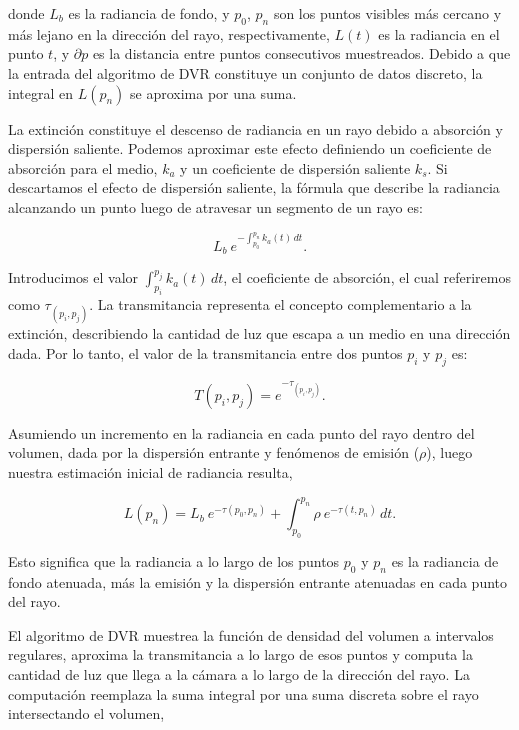 \noindent donde $L_b$ es la radiancia de fondo, y $p_0$, $p_n$ son los puntos visibles más cercano y más lejano en la dirección del rayo, respectivamente, $L(t)$  es la radiancia en el punto $t$, y $\partial p$ es la distancia entre puntos consecutivos muestreados. 
Debido a que la entrada del algoritmo de DVR constituye un conjunto de datos discreto, la integral en $L(p_n)$ se aproxima por una suma.

La extinción constituye el descenso de radiancia en un rayo debido a absorción y dispersión saliente.
Podemos aproximar este efecto definiendo un coeficiente de absorción para el medio, $k_a$ y un coeficiente de dispersión saliente $k_s$. 
Si descartamos el efecto de dispersión saliente, la fórmula que describe la radiancia alcanzando un punto luego de atravesar un segmento de un rayo es:

\begin{equation} \label{eq:radiance_absorption}  
    L_b \ e^{- \textstyle  \int_{p_0}^{p_n} k_a(t) \, dt}.
\end{equation}

Introducimos el valor $\int_{p_i}^{p_j} k_a(t) \, dt$, el coeficiente de absorción, el cual referiremos como $\tau_{(p_i, p_j)}$. 
La transmitancia representa el concepto complementario a la extinción, describiendo la cantidad de luz que escapa a un medio en una dirección dada.
Por lo tanto, el valor de la transmitancia entre dos puntos $p_i$ y $p_j$ es:

\begin{equation} \label{eq:transmittance}  
  T(p_i,p_j) = e^{- \textstyle \tau_{(p_i, p_j)}}.
\end{equation}

Asumiendo un incremento en la radiancia en cada punto del rayo dentro del volumen, dada por la dispersión entrante y fenómenos de emisión ($\rho$), luego nuestra estimación inicial de radiancia resulta,

\begin{equation} \label{eq:ray_radiance}  
  L(p_n) = L_b \ e^{-\tau(p_0, p_n)} + \int_{p_0}^{p_n} \rho \ e^{-\tau(t,p_n)} \, dt.
\end{equation}

Esto significa que la radiancia a lo largo de los puntos $p_0$ y $p_n$ es la radiancia de fondo atenuada, más la emisión y la dispersión entrante atenuadas en cada punto del rayo.

El algoritmo de DVR muestrea la función de densidad del volumen a intervalos regulares, aproxima la transmitancia a lo largo de esos puntos y computa la cantidad de luz que llega a la cámara a lo largo de la dirección del rayo.
La computación reemplaza la suma integral por una suma discreta sobre el rayo intersectando el volumen,

